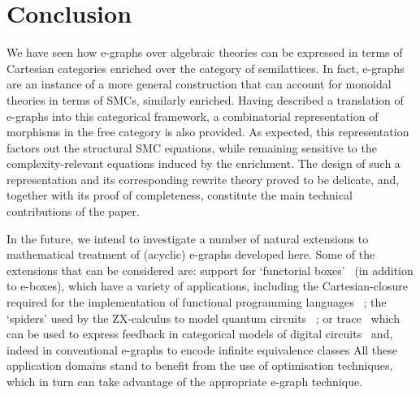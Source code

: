 \section{Conclusion}

We have seen how e-graphs over algebraic theories can be expressed in terms of Cartesian categories enriched over the category of semilattices. 
In fact, e-graphs are an instance of a more general construction that can account for monoidal theories in terms of SMCs,  similarly enriched.  
Having described a translation of e-graphs into this categorical framework, a combinatorial representation of morphisms in the free category is also provided. 
As expected, this representation factors out the structural SMC equations, while remaining sensitive to the complexity-relevant equations induced by the enrichment.  
The design of such a representation and its corresponding rewrite theory proved to be delicate, and, together with its proof of completeness, constitute the main technical contributions of the paper.  

In the future,  we intend to investigate a number of natural extensions to mathematical treatment of (acyclic) e-graphs developed here.
Some of the extensions that can be considered are: support for `functorial boxes'~\cite{mellies_functorial_2006} (in addition to e-boxes), which have a variety of applications, including the Cartesian-closure required for the implementation of functional programming languages~\cite{ghica-zanassi2023string}
; the `spiders' used by the ZX-calculus to model quantum circuits~\cite{coecke_interacting_2011,ZX}
; or trace~\cite{joyal_geometry_1991, Hasegawa-traced} which can be used to express feedback in categorical models of digital circuits~\cite{ghica_jung_2017,ghica_compositional_2023} and, indeed in conventional e-graphs to encode infinite equivalence classes
All these application domains stand to benefit from the use of optimisation techniques, which in turn can take advantage of the appropriate e-graph technique.


